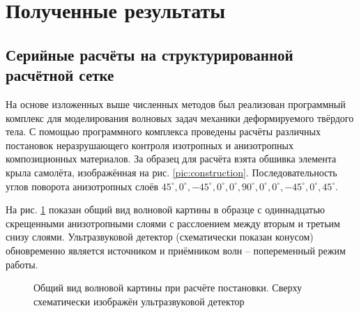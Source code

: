 \newpage
\section{Полученные результаты}
\subsection{Серийные расчёты на структурированной расчётной сетке}
На основе изложенных выше численных методов был реализован программный комплекс для моделирования волновых задач механики деформируемого твёрдого тела. С помощью программного комплекса проведены расчёты различных постановок неразрушающего контроля изотропных и анизотропных композиционных материалов. За образец для расчёта взята обшивка элемента крыла самолёта, изображённая на рис. \ref{pic:construction}. Последовательность углов поворота анизотропных слоёв $45^{\circ}, 0^{\circ}, -45^{\circ}, 0^{\circ}, 0^{\circ}, 90^{\circ}, 0^{\circ}, 0^{\circ}, -45^{\circ}, 0^{\circ}, 45^{\circ}$.

На рис. \ref{pic:general-view} показан общий вид волновой картины в образце с одиннадцатью скрещенными анизотропными слоями с расслоением между вторым и третьим снизу слоями. Ультразвуковой детектор (схематически показан конусом) обновременно является источником и приёмником волн -- попеременный режим работы.
\begin{figure}[H]
	\caption{Общий вид волновой картины при расчёте постановки. Сверху схематически изображён ультразвуковой детектор}
	\label{pic:general-view}
\end{figure}

